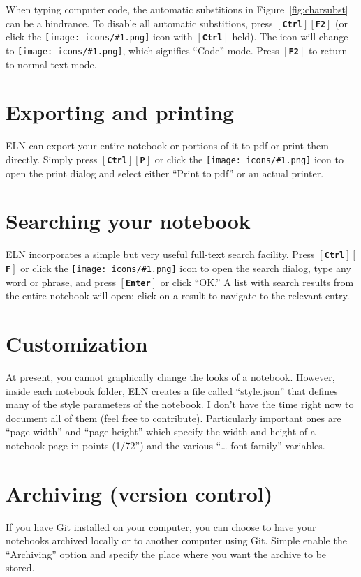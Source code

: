 \documentclass[11pt]{report}
\def\keystroke#1{$\left[\right.\!${\tt\bfseries #1}$\!\left.\right]$}
\def\key#1{\keystroke{#1}}
\def\keycombo#1#2{\keystroke{#1}\keystroke{#2}}
\def\keycontrol#1{\keycombo{Ctrl}{#1}}
\def\icon#1{\raise-2pt\hbox{\texttt{[image: icons/\#1.png]}}}
\begin{document}
When typing computer code, the automatic substitions in
Figure~\ref{fig:charsubst} can be a hindrance. To disable all
automatic substitions, press \keycontrol{F2} (or click the
\icon{type} icon with \key{Ctrl} held). The icon will
change to \icon{type-code}, which signifies ``Code''
mode. Press \key{F2} to return to normal text mode.

\section{Exporting and printing}

ELN can export your entire notebook or portions of it to pdf or print
them directly. Simply press \keycontrol{P} or click the
\icon{nav-print} icon
to open the print dialog and select either ``Print to pdf'' or an
actual printer.

\section{Searching your notebook}

ELN incorporates a simple but very useful full-text search
facility. Press \keycontrol{F} or click the \icon{nav-find} icon to open the
search dialog, type any word or phrase, and press \key{Enter} or click
``OK.'' A list with search results from the entire notebook will open;
click on a result to navigate to the relevant entry.

\section{Customization}

At present, you cannot graphically change the looks of a
notebook. However, inside each notebook folder, ELN creates a file
called ``style.json'' that defines many of the style parameters of the
notebook. I don't have the time right now to document all of them
(feel free to contribute). Particularly important ones are
``page-width'' and ``page-height'' which specify the width and height
of a notebook page in points (1/72'') and the various
``\ldots-font-family'' variables.

\section{Archiving (version control)}

If you have Git installed on your computer, you can choose to have
your notebooks archived locally or to another computer using
Git. Simple enable the ``Archiving'' option and specify the place
where you want the archive to be stored.
\end{document}

